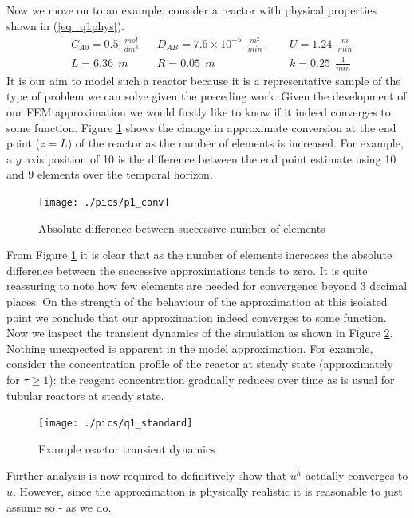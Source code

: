 \documentclass[11pt,fleqn]{article}
\theoremstyle{defstyle}
\begin{document}
Now we move on to an example: consider a reactor with physical properties shown in (\ref{eq_q1phys}).
\begin{equation}
\begin{aligned}
&C_{A0} = 0.5~~ \frac{mol}{dm^3}
&&D_{AB} = 7.6\times 10^{-5} ~~\frac{m^2}{min}
&&&U = 1.24~~ \frac{m}{min} \\
&L = 6.36~~ m 
&&R = 0.05~~ m
&&&k = 0.25~~ \frac{1}{min} 
\end{aligned}
\label{eq_q1phys}
\end{equation}
It is our aim to model such a reactor because it is a representative sample of the type of problem we can solve given the preceding work. Given the development of our FEM approximation we would firstly like to know if it indeed converges to some function. Figure \ref{fig_p1conv} shows the change in approximate conversion at the end point ($z=L$) of the reactor as the number of elements is increased. For example, a $y$ axis position of 10 is the difference between the end point estimate using 10 and 9 elements over the temporal horizon.
\begin{figure}[H] 
\centering
\texttt{[image: ./pics/p1\_conv]}
\caption{Absolute difference between successive number of elements} 
\label{fig_p1conv}
\end{figure}
From Figure \ref{fig_p1conv} it is clear that as the number of elements increases the absolute difference between the successive approximations tends to zero. It is quite reassuring to note how few elements are needed for convergence beyond 3 decimal places. On the strength of the behaviour of the approximation at this isolated point we conclude that our approximation indeed converges to some function. Now we inspect the transient dynamics of the simulation as shown in Figure \ref{fig_q1std}. Nothing unexpected is apparent in the model approximation. For example, consider the concentration profile of the reactor at steady state (approximately for $\tau \geq 1$): the reagent concentration gradually reduces over time as is usual for tubular reactors at steady state.
\begin{figure}[H] 
\centering
\texttt{[image: ./pics/q1\_standard]}
\caption{Example reactor transient dynamics} 
\label{fig_q1std}
\end{figure}
Further analysis is now required to definitively show that $u^h$ actually converges to $u$. However, since the approximation is physically realistic it is reasonable to just assume so - as we do.
\end{document}
